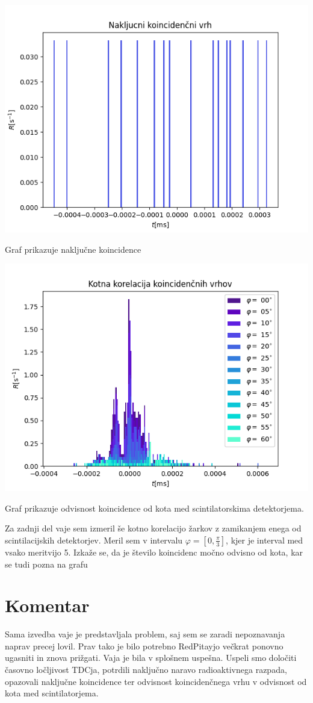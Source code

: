 \documentclass[11pt]{article}
\begin{document}
\begin{slika}[H]
  \centering
  \includegraphics[width=.9\linewidth]{figures/nakljucne_koincidence.png}
  \caption{\small Graf prikazuje naključne koincidence}
\end{slika}

\begin{slika}[H]
  \centering
  \includegraphics[width=.9\linewidth]{figures/koincidence_kot.png}
  \caption{\small Graf prikazuje odvisnost koincidence od kota med scintilatorskima detektorjema.}\label{fig:test}
\end{slika}

Za zadnji del vaje sem izmeril še kotno korelacijo žarkov z zamikanjem enega od scintilacijskih detektorjev. Meril sem v intervalu \(\varphi = [0, \frac{\pi}{3}]\), kjer je interval med vsako meritvijo 5. Izkaže se, da je število koincidenc močno odvisno od kota, kar se tudi pozna na grafu %

\section{Komentar}\label{sec:org1a6bddf}

Sama izvedba vaje je predstavljala problem, saj sem se zaradi nepoznavanja naprav precej lovil. Prav tako je bilo potrebno RedPitayjo večkrat ponovno ugasniti in znova prižgati.
Vaja je bila v splošnem uspešna. Uspeli smo določiti časovno ločljivost TDCja, potrdili naključno naravo radioaktivnega razpada, opazovali naključne koincidence ter odvisnost koincidenčnega vrhu v odvisnost od kota med scintilatorjema.
\end{document}
